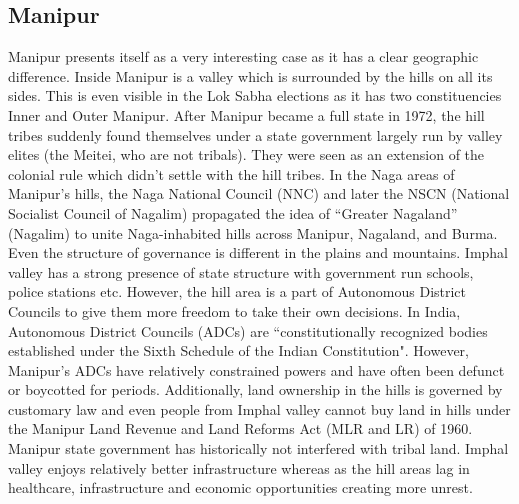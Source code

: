 \subsection{Manipur}

Manipur presents itself as a very interesting case as it has a clear geographic difference. Inside Manipur is a valley which is surrounded by the hills on all its sides. This is even visible in the Lok Sabha elections as it has two constituencies Inner and Outer Manipur. After Manipur became a full state in 1972, the hill tribes suddenly found themselves under a state government largely run by valley elites (the Meitei, who are not tribals). They were seen as an extension of the colonial rule which didn't settle with the hill tribes.  In the Naga areas of Manipur’s hills, the Naga National Council (NNC) and later the NSCN (National Socialist Council of Nagalim) propagated the idea of ``Greater Nagaland” (Nagalim) to unite Naga\hyp{}inhabited hills across Manipur, Nagaland, and Burma. Even the structure of governance is different in the plains and mountains. Imphal valley has a strong presence of state structure with government run schools, police stations etc. However, the hill area is a part of Autonomous District Councils to give them more freedom to take their own decisions. In India, Autonomous District Councils (ADCs) are ``constitutionally recognized bodies established under the Sixth Schedule of the Indian Constitution". However, Manipur’s ADCs have relatively constrained powers and have often been defunct or boycotted for periods. Additionally, land ownership in the hills is governed by customary law and even people from Imphal valley cannot buy land in hills under the  Manipur Land Revenue and Land Reforms Act (MLR and LR) of 1960. Manipur state government has historically not interfered with tribal land. 
Imphal valley enjoys relatively better infrastructure whereas as the hill areas lag in healthcare, infrastructure and economic opportunities creating more unrest. \citep{lacina2009problem}

